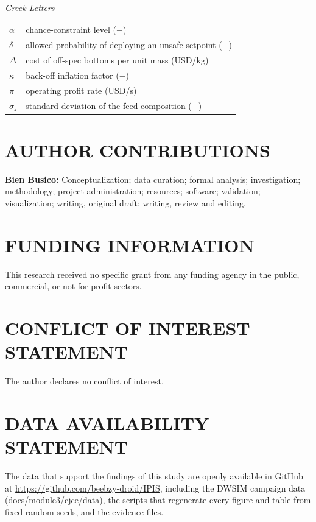 \documentclass[12pt]{article}
\begin{document}
\medskip\noindent\textit{Greek Letters}\\[2pt]
\begin{tabular}{@{}p{}p{}@{}}
$\alpha$ & chance-constraint level ($-$) \\
$\delta$ & allowed probability of deploying an unsafe setpoint ($-$) \\
$\Delta$ & cost of off-spec bottoms per unit mass (USD/kg) \\
$\kappa$ & back-off inflation factor ($-$) \\
$\pi$ & operating profit rate (USD/s) \\
$\sigma_z$ & standard deviation of the feed composition ($-$) \\
\end{tabular}
\endgroup

\section*{AUTHOR CONTRIBUTIONS}
\textbf{Bien Busico:} Conceptualization; data curation; formal analysis; investigation;
methodology; project administration; resources; software; validation; visualization; writing,
original draft; writing, review and editing.

\section*{FUNDING INFORMATION}
This research received no specific grant from any funding agency in the public, commercial, or
not-for-profit sectors.

\section*{CONFLICT OF INTEREST STATEMENT}
The author declares no conflict of interest.

\section*{DATA AVAILABILITY STATEMENT}
The data that support the findings of this study are openly available in GitHub at
\url{https://github.com/beebzy-droid/IPIS}, including the DWSIM campaign data
(\url{docs/module3/cjce/data}), the scripts that regenerate every figure and table from fixed random
seeds, and the evidence files.



\end{document}

